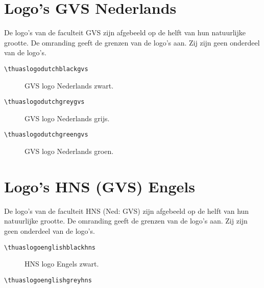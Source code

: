 \documentclass[a4paper,12pt]{article}
\begin{document}
\section{Logo's GVS Nederlands}
De logo's van de faculteit GVS zijn afgebeeld op de helft van hun natuurlijke grootte.
De omranding geeft de grenzen van de logo's aan. Zij zijn geen onderdeel
van de logo's.

\begin{verbatim}
\thuaslogodutchblackgvs
\end{verbatim}

\begin{figure}[H]
\centering\fboxsep=0pt%
\fbox{%
\scalebox{0.7071}{\thuaslogodutchblackgvs}}
\caption{GVS logo Nederlands zwart.}
\end{figure}

\begin{verbatim}
\thuaslogodutchgreygvs
\end{verbatim}

\begin{figure}[H]
\centering\fboxsep=0pt%
\fbox{%
\scalebox{0.7071}{\thuaslogodutchgreygvs}}
\caption{GVS logo Nederlands grijs.}
\end{figure}

\begin{verbatim}
\thuaslogodutchgreengvs
\end{verbatim}

\begin{figure}[H]
\centering\fboxsep=0pt%
\fbox{%
\scalebox{0.7071}{\thuaslogodutchgreengvs}}
\caption{GVS logo Nederlands groen.}
\end{figure}


\section{Logo's HNS (GVS) Engels}
De logo's van de faculteit HNS (Ned: GVS) zijn afgebeeld op de helft van hun natuurlijke grootte.
De omranding geeft de grenzen van de logo's aan. Zij zijn geen onderdeel
van de logo's.

\begin{verbatim}
\thuaslogoenglishblackhns
\end{verbatim}

\begin{figure}[H]
\centering\fboxsep=0pt%
\fbox{%
\scalebox{0.7071}{\thuaslogoenglishblackhns}}
\caption{HNS logo Engels zwart.}
\end{figure}

\begin{verbatim}
\thuaslogoenglishgreyhns
\end{verbatim}
\end{document}
